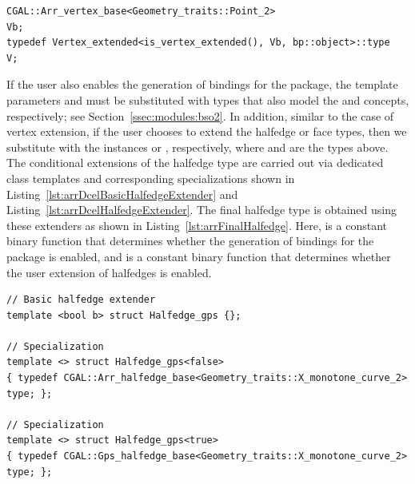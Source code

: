 \begin{lstfloat}
  \begin{lstlisting}[style=cppFramedStyle,basicstyle=\normalsize,%
                     label={lst:arrFinalVertex},%
                     caption={The final 2D Arrangement vertex type definition.}]
CGAL::Arr_vertex_base<Geometry_traits::Point_2>                         Vb;
typedef Vertex_extended<is_vertex_extended(), Vb, bp::object>::type     V;
  \end{lstlisting}
\end{lstfloat}

If the user also enables the generation of bindings for the 
\iiDRegularizedBooleanSetOperationsPackage{} package, the template 
parameters  and  must be substituted with 
types that also model the  
 and
 concepts, respectively; see 
Section~\ref{ssec:modules:bso2}. In addition, similar to the case of
vertex extension, if the user chooses to extend the halfedge or face types, 
then we substitute  with the instances
 or
, respectively, where
 and  are the types above. The 
conditional extensions of the halfedge type are carried out via dedicated 
class templates and corresponding specializations shown in 
Listing~\ref{lst:arrDcelBasicHalfedgeExtender} and
Listing~\ref{lst:arrDcelHalfedgeExtender}. The final halfedge type is obtained
using these extenders as shown in Listing~\ref{lst:arrFinalHalfedge}. Here,
 is a constant binary
function that determines whether the generation of bindings for the 
\iiDRegularizedBooleanSetOperationsPackage{} package is enabled, and
 is a constant binary function that 
determines whether the user extension of halfedges is enabled.

\begin{lstfloat}
  \begin{lstlisting}[style=cppFramedStyle,basicstyle=\normalsize,%
                     label={lst:arrDcelBasicHalfedgeExtender},%
                     caption={2D Arrangement DCEL Halfedge extender for 2D Regularized Boolean set operations.}]
// Basic halfedge extender
template <bool b> struct Halfedge_gps {};

// Specialization
template <> struct Halfedge_gps<false>
{ typedef CGAL::Arr_halfedge_base<Geometry_traits::X_monotone_curve_2> type; };

// Specialization
template <> struct Halfedge_gps<true>
{ typedef CGAL::Gps_halfedge_base<Geometry_traits::X_monotone_curve_2> type; };
  \end{lstlisting}
\end{lstfloat}

